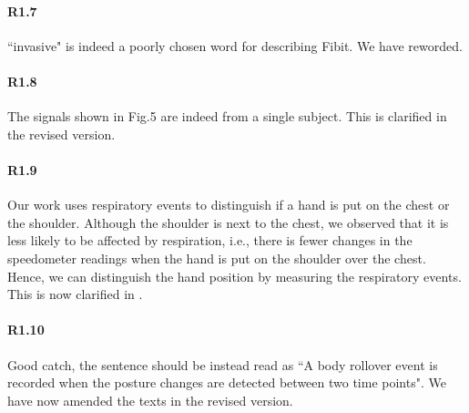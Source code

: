 \paragraph{R1.7} ``invasive" is indeed a poorly chosen word for describing Fibit. We have reworded.

\paragraph{R1.8} The signals shown in Fig.5 are indeed from a single subject. This is clarified in the revised version.

\paragraph{R1.9} Our work uses respiratory events to distinguish if a hand is put on the chest or the shoulder. Although the shoulder is
next to the chest, we observed that it is less likely to be affected by respiration, i.e., there is fewer changes in the speedometer
readings when the hand is put on the shoulder over the chest. Hence, we can distinguish the hand position by measuring the respiratory
events. This is now clarified in .




\paragraph{R1.10} Good catch, the sentence should be instead read as ``A body rollover event is recorded when the posture changes are detected between
two time points". We have now amended the texts in the revised version.

